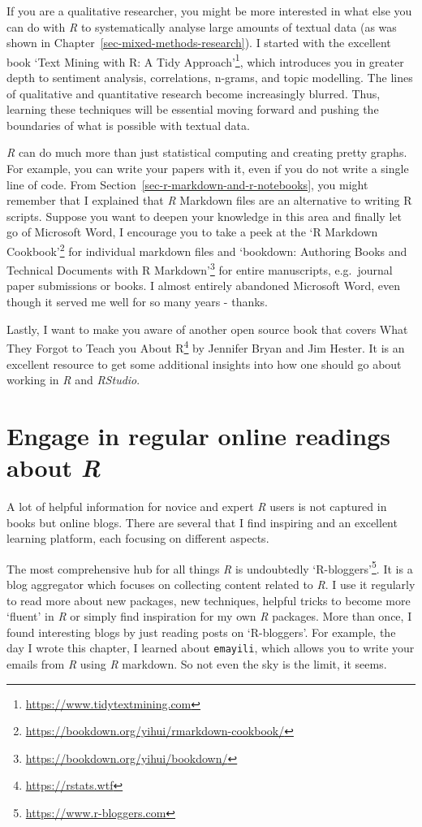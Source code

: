 \documentclass[
  letterpaper,
]{krantz}
\renewcommand{\href}[2]{#2\footnote{\url{#1}}}
\begin{document}
If you are a qualitative researcher, you might be more interested in
what else you can do with \emph{R} to systematically analyse large
amounts of textual data (as was shown in
Chapter~\ref{sec-mixed-methods-research}). I started with the excellent
book \href{https://www.tidytextmining.com}{`Text Mining with R: A Tidy
Approach'}, which introduces you in greater depth to sentiment analysis,
correlations, n-grams, and topic modelling. The lines of qualitative and
quantitative research become increasingly blurred. Thus, learning these
techniques will be essential moving forward and pushing the boundaries
of what is possible with textual data.

\emph{R} can do much more than just statistical computing and creating
pretty graphs. For example, you can write your papers with it, even if
you do not write a single line of code. From
Section~\ref{sec-r-markdown-and-r-notebooks}, you might remember that I
explained that \emph{R} Markdown files are an alternative to writing R
scripts. Suppose you want to deepen your knowledge in this area and
finally let go of Microsoft Word, I encourage you to take a peek at the
\href{https://bookdown.org/yihui/rmarkdown-cookbook/}{`R Markdown
Cookbook'} for individual markdown files and
\href{https://bookdown.org/yihui/bookdown/}{`bookdown: Authoring Books
and Technical Documents with R Markdown'} for entire manuscripts,
e.g.~journal paper submissions or books. I almost entirely abandoned
Microsoft Word, even though it served me well for so many years -
thanks.

Lastly, I want to make you aware of another open source book that covers
\href{https://rstats.wtf}{What They Forgot to Teach you About R} by
Jennifer Bryan and Jim Hester. It is an excellent resource to get some
additional insights into how one should go about working in \emph{R} and
\emph{RStudio}.

\section{\texorpdfstring{Engage in regular online readings about
\emph{R}}{Engage in regular online readings about R}}\label{sec-next-steps-online-readings}

A lot of helpful information for novice and expert \emph{R} users is not
captured in books but online blogs. There are several that I find
inspiring and an excellent learning platform, each focusing on different
aspects.

The most comprehensive hub for all things \emph{R} is undoubtedly
\href{https://www.r-bloggers.com}{`R-bloggers'}. It is a blog aggregator
which focuses on collecting content related to \emph{R}. I use it
regularly to read more about new packages, new techniques, helpful
tricks to become more `fluent' in \emph{R} or simply find inspiration
for my own \emph{R} packages. More than once, I found interesting blogs
by just reading posts on `R-bloggers'. For example, the day I wrote this
chapter, I learned about \texttt{emayili}, which allows you to write
your emails from \emph{R} using \emph{R} markdown. So not even the sky
is the limit, it seems.
\end{document}
